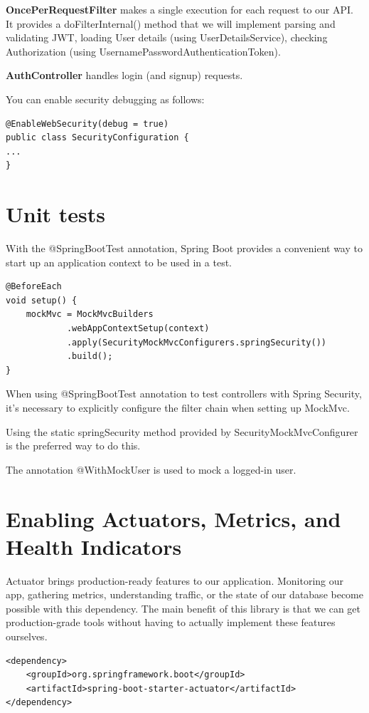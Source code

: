 \textbf{OncePerRequestFilter} makes a single execution for each request to our API. It provides a doFilterInternal() method that we will implement parsing and validating JWT, loading User details (using UserDetailsService), checking Authorization (using UsernamePasswordAuthenticationToken).

\textbf{AuthController} handles login (and signup) requests.

You can enable security debugging as follows:

\begin{lstlisting}
@EnableWebSecurity(debug = true)
public class SecurityConfiguration {
...
}
\end{lstlisting}

\section{Unit tests}

With the @SpringBootTest annotation, Spring Boot provides a convenient way to start up an application context to be used in a test.

\begin{lstlisting}
@BeforeEach
void setup() {
	mockMvc = MockMvcBuilders
			.webAppContextSetup(context)
			.apply(SecurityMockMvcConfigurers.springSecurity())
			.build();
}
\end{lstlisting}

When using @SpringBootTest annotation to test controllers with Spring Security, it's necessary to explicitly configure the filter chain when setting up MockMvc.

Using the static springSecurity method provided by  SecurityMockMvcConfigurer is the preferred way to do this.

The annotation @WithMockUser is used to mock a logged-in user.

\section{Enabling Actuators, Metrics, and Health Indicators}

Actuator brings production-ready features to our application.
Monitoring our app, gathering metrics, understanding traffic, or the state of our database become possible with this dependency.
The main benefit of this library is that we can get production-grade tools without having to actually implement these features ourselves.

\begin{lstlisting}
<dependency>
	<groupId>org.springframework.boot</groupId>
	<artifactId>spring-boot-starter-actuator</artifactId>
</dependency>
\end{lstlisting}

